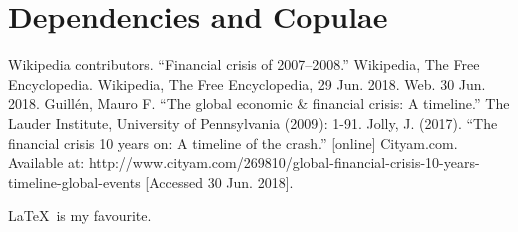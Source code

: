 \documentclass[11pt]{article}
\begin{document}
\section{Dependencies and Copulae}\vspace{-1em}


\newpage
\vspace{-0.8em}
\begin{thebibliography}{9}
 Wikipedia contributors. ``Financial crisis of 2007–2008.'' Wikipedia, The Free Encyclopedia. Wikipedia, The Free Encyclopedia, 29 Jun. 2018. Web. 30 Jun. 2018.
 Guillén, Mauro F. ``The global economic \& financial crisis: A timeline.'' The Lauder Institute, University of Pennsylvania (2009): 1-91.
 Jolly, J. (2017). ``The financial crisis 10 years on: A timeline of the crash.'' [online] Cityam.com. Available at: http://www.cityam.com/269810/global-financial-crisis-10-years-timeline-global-events [Accessed 30 Jun. 2018].
\end{thebibliography}
\LaTeX\ is my favourite.
\end{document}
